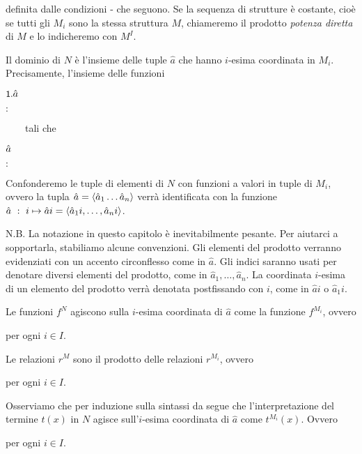 
definita dalle condizioni - che seguono. Se la sequenza di strutture \`e costante, cio\`e se tutti gli $M_i$ sono la stessa struttura $M$, chiameremo il prodotto \emph{potenza diretta\/} di $M$ e lo indicheremo con $M^I$.

Il dominio di $N$ \`e l'insieme delle tuple $\hat a$ che hanno $i$-esima coordinata in $M_i$. Precisamente, l'insieme  delle funzioni


{\def\ceq#1#2#3{\parbox{20ex}{$\displaystyle #1$}\parbox{3ex}{\hfil$\displaystyle #2$}\rlap{$\displaystyle  #3$}\hspace{20ex}}


\ceq{\ssf{1.}\hfill \hat a}{:}{I\ \to\ \bigcup_{i\in I}M_i} \ \ \ \  tali che \smallskip

\ceq{\hfill \hat a}{:}{i\ \ \mapsto\ \ \hat ai\ \in\ M_i}

}

Confonderemo le tuple di elementi di $N$ con funzioni a valori in tuple di $M_i$, ovvero la tupla $\hat a=\langle\hat a_1\dots\hat a_n\rangle$ verr\`a identificata con la funzione $\hat a\ :\ i\mapsto\hat ai=\langle\hat a_1i,\dots,\hat a_ni\rangle$.\smallskip

N.B. La notazione in questo capitolo \`e inevitabilmente pesante. Per aiutarci a sopportarla, stabiliamo alcune convenzioni. Gli elementi del prodotto verranno evidenziati con un accento circonflesso come in $\hat a$. Gli indici saranno usati per denotare diversi elementi del prodotto, come in $\hat a_1,\dots,\hat a_n$. La coordinata $i$-esima di un elemento del prodotto verr\`a denotata postfissando con $i$, come in $\hat ai$ o  $\hat a_{1}i$.  

Le funzioni $f^N$ agiscono sulla $i$-esima coordinata di $\hat a$ come la funzione $f^{M_i}$, ovvero


 per ogni $i\in I$.

Le relazioni $r^M$ sono il prodotto delle relazioni $r^{M_i}$, ovvero 



 per ogni $i\in I$.

Osserviamo che per induzione sulla sintassi da  segue che l'interpretazione del termine $t(x)$ in $N$ agisce sull'$i$-esima coordinata di $\hat a$ come $t^{M_i}(x)$. Ovvero



  per ogni $i\in I$.

